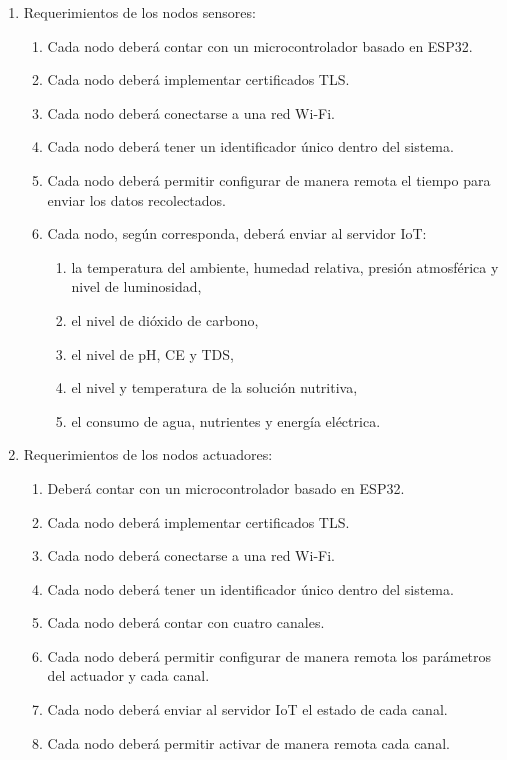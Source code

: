 \begin{enumerate}
	\item Requerimientos de los nodos sensores:
	      \begin{enumerate}
		      \item Cada nodo deberá contar con un microcontrolador basado en ESP32.
		      \item Cada nodo deberá implementar certificados TLS.
		      \item Cada nodo deberá conectarse a una red Wi-Fi.
		      \item Cada nodo deberá tener un identificador único dentro del sistema.
		      \item Cada nodo deberá permitir configurar de manera remota el tiempo para enviar los datos recolectados.
		      \item Cada nodo, según corresponda, deberá enviar al servidor IoT:
		            \begin{enumerate}
			            \item la temperatura del ambiente, humedad relativa, presión atmosférica y nivel de luminosidad,
			            \item el nivel de dióxido de carbono,
			            \item el nivel de pH, CE y TDS,
			            \item el nivel y temperatura de la solución nutritiva,
			            \item el consumo de agua, nutrientes y energía eléctrica.
		            \end{enumerate}
	      \end{enumerate}

	\item Requerimientos de los nodos actuadores:
	      \begin{enumerate}
		      \item Deberá contar con un microcontrolador basado en ESP32.
		      \item Cada nodo deberá implementar certificados TLS.
		      \item Cada nodo deberá conectarse a una red Wi-Fi.
		      \item Cada nodo deberá tener un identificador único dentro del sistema.
		      \item Cada nodo deberá contar con cuatro canales.
		      \item Cada nodo deberá permitir configurar de manera remota los parámetros del actuador y cada canal.
		      \item Cada nodo deberá enviar al servidor IoT el estado de cada canal.
		      \item Cada nodo deberá permitir activar de manera remota cada canal.
	      \end{enumerate}


\end{enumerate}
